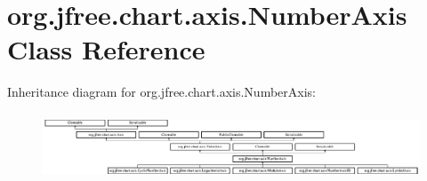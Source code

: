 \hypertarget{classorg_1_1jfree_1_1chart_1_1axis_1_1_number_axis}{}\section{org.\+jfree.\+chart.\+axis.\+Number\+Axis Class Reference}
\label{classorg_1_1jfree_1_1chart_1_1axis_1_1_number_axis}
Inheritance diagram for org.\+jfree.\+chart.\+axis.\+Number\+Axis\+:\begin{figure}[H]
\begin{center}
\leavevmode
\includegraphics[height=1.977401cm]{classorg_1_1jfree_1_1chart_1_1axis_1_1_number_axis}
\end{center}
\end{figure}
